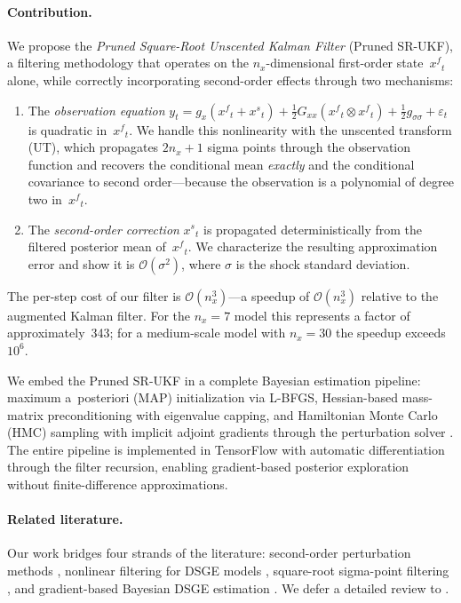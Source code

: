 \documentclass[12pt,a4paper]{article}
\newcommand{\kron}{\otimes}
\newcommand{\xf}{{x^{f}}}
\newcommand{\xs}{{x^{s}}}
\newcommand{\gx}{g_x}
\newcommand{\Gxx}{G_{xx}}
\newcommand{\gss}{{g_{\sigma\sigma}}}
\newcommand{\cO}{\mathcal{O}}
\begin{document}
\paragraph{Contribution.}
We propose the \emph{Pruned Square-Root Unscented Kalman Filter}
(Pruned SR-UKF), a filtering methodology that operates on the
$n_x$-dimensional first-order state~$\xf_t$ alone, while correctly
incorporating second-order effects through two mechanisms:
\begin{enumerate}[nosep]
\item The \emph{observation equation}
$y_t = \gx(\xf_t + \xs_t) + \tfrac{1}{2}\Gxx(\xf_t \kron \xf_t) + \tfrac{1}{2}\gss + \varepsilon_t$
is quadratic in~$\xf_t$. We handle this nonlinearity with the
unscented transform (UT), which propagates $2n_x + 1$ sigma points
through the observation function and recovers the conditional mean
\emph{exactly} and the conditional covariance to second order---because
the observation is a polynomial of degree two in~$\xf_t$.
\item The \emph{second-order correction} $\xs_t$ is propagated
deterministically from the filtered posterior mean of~$\xf_t$. We
characterize the resulting approximation error and show it is
$\cO(\sigma^2)$, where $\sigma$ is the shock standard deviation.
\end{enumerate}
The per-step cost of our filter is $\cO(n_x^3)$---a speedup of
$\cO(n_x^3)$ relative to the augmented Kalman filter. For the
$n_x = 7$ \citet{schmitt2003closing} model this represents a factor
of approximately~343; for a medium-scale model with $n_x = 30$ the
speedup exceeds $10^6$.

We embed the Pruned SR-UKF in a complete Bayesian estimation pipeline:
maximum a~posteriori (MAP) initialization via L-BFGS, Hessian-based
mass-matrix preconditioning with eigenvalue capping, and Hamiltonian
Monte Carlo (HMC) sampling with implicit adjoint gradients through the
perturbation solver \citep{childers2024differentiable}. The entire
pipeline is implemented in TensorFlow with automatic differentiation
through the filter recursion, enabling gradient-based posterior
exploration without finite-difference approximations.

\paragraph{Related literature.}
Our work bridges four strands of the literature: second-order
perturbation methods
\citep{schmitt2004solving, kim2008calculating, andreasen2018pruned},
nonlinear filtering for DSGE models
\citep{fernandez2007estimating, kollmann2014tractable, ivashchenko2014dsge, andreasen2012non},
square-root sigma-point filtering
\citep{julier1997new, wan2000unscented, van2001square},
and gradient-based Bayesian DSGE estimation
\citep{childers2024differentiable}. We defer a detailed review to
.
\end{document}
